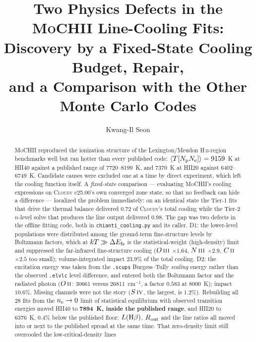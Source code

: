 \documentclass[english,a4paper]{my_memo}
\newcommand{\code}[1]{\texttt{#1}}
\newcommand{\MoCHII}{\textsc{MoCHII}}
\newcommand{\Cloudy}{\textsc{Cloudy}}
\newcommand{\HII}{H\,\textsc{ii}}
\newcommand{\OII}{O\,\textsc{ii}}
\newcommand{\OIII}{O\,\textsc{iii}}
\newcommand{\NIII}{N\,\textsc{iii}}
\newcommand{\CII}{C\,\textsc{ii}}
\newcommand{\SIV}{S\,\textsc{iv}}
\newcommand{\nel}{n_{\rm e}}
\begin{document}
\title{Two Physics Defects in the \MoCHII{} Line-Cooling Fits:\\
Discovery by a Fixed-State Cooling Budget, Repair,\\
and a Comparison with the Other Monte Carlo Codes}
\author{Kwang-Il Seon}
\date{\docmoddate}
\maketitle

\begin{abstract}
\MoCHII{} reproduced the ionization structure of the Lexington/Meudon
\HII{}-region benchmarks well but ran hotter than every published code:
$\langle T[N_{\rm p}N_{\rm e}]\rangle = 9159$~K at HII40 against a published
range of 7720--8199~K, and 7370~K at HII20 against 6402--6749~K.  Candidate
causes were excluded one at a time by direct experiment, which left the
cooling function itself.  A \emph{fixed-state} comparison --- evaluating
\MoCHII{}'s cooling expressions on \Cloudy{} c25.00's own converged zone
state, so that no feedback can hide a difference --- localized the problem
immediately: on an identical state the Tier-1 fits that drive the thermal
balance delivered $0.72$ of \Cloudy{}'s total cooling while the Tier-2
$n$-level solve that produces the line output delivered $0.98$.  The gap was
two defects in the offline fitting code, both in \code{chianti\_cooling.py}
and its caller.  D1: the lower-level populations were distributed among the
ground-term fine-structure levels by Boltzmann factors, which at
$kT \gg \Delta E_{\rm fs}$ is the statistical-weight (high-density) limit and
suppressed the far-infrared fine-structure cooling ($\OIII{}$ $\times 1.64$,
$\NIII{}$ $\times 2.9$, $\CII{}$ $\times 2.5$ too small); volume-integrated
impact $23.9\%$ of the total cooling.  D2: the excitation energy was taken
from the \code{.scups} Burgess--Tully \emph{scaling} energy rather than the
observed \code{.elvlc} level difference, and entered both the Boltzmann factor
and the radiated photon ($\OII{}$: 30661 versus 26811~cm$^{-1}$, a factor
$0.583$ at 8000~K); impact $10.6\%$.  Missing channels were not the story
($\SIV{}$, the largest, is $1.2\%$).  Rebuilding all 28 fits from the
$\nel \to 0$ limit of statistical equilibrium with observed transition energies
moved HII40 to \textbf{7894~K, inside the published range}, and HII20 to
6376~K, $0.4\%$ below the published floor; $L({\rm H}\beta)$, $R_{\rm out}$
and the line ratios all moved into or next to the published spread at the same
time.  That zero-density limit still overcooled the low-critical-density lines

\end{abstract}
\end{document}
